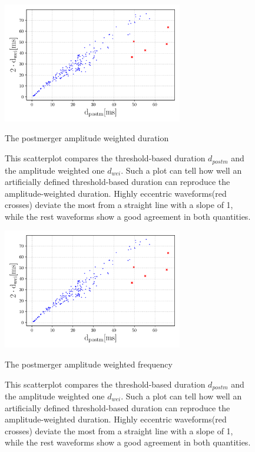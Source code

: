 \begin{figure}[hbt!]
\begin{center}
\includegraphics[width=0.7\textwidth, angle=0]{images/Data_analysis/results/res1.pdf}
\captionsetup{width=0.8\textwidth}
\caption{The postmerger amplitude weighted duration}
\caption*{This scatterplot compares the threshold-based duration $d_{postm}$ and the amplitude weighted one $d_{wei}$. Such a plot can tell how well an artificially defined threshold-based duration can reproduce the amplitude-weighted duration. Highly eccentric waveforms(red crosses) deviate the most from a straight line with a slope of 1, while the rest waveforms show a good agreement in both quantities.}
\label{duration measure}
\end{center}
\end{figure}


\begin{figure}[hbt!]
\begin{center}
\includegraphics[width=0.7\textwidth, angle=0]{images/Data_analysis/results/res1.pdf}
\captionsetup{width=0.8\textwidth}
\caption{The postmerger amplitude weighted frequency}
\caption*{This scatterplot compares the threshold-based duration $d_{postm}$ and the amplitude weighted one $d_{wei}$. Such a plot can tell how well an artificially defined threshold-based duration can reproduce the amplitude-weighted duration. Highly eccentric waveforms(red crosses) deviate the most from a straight line with a slope of 1, while the rest waveforms show a good agreement in both quantities.}
\label{duration measure}
\end{center}
\end{figure}

\FloatBarrier








